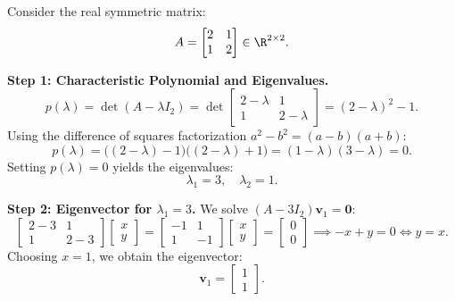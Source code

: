 \begin{example}
\label{ex:eigenvalues-2x2}
Consider the real symmetric matrix:
\begin{equation}
    A = \begin{bmatrix} 2 & 1 \\ 1 & 2 \end{bmatrix} \in \R^{2 \times 2}.
\end{equation}

\noindent\textbf{Step 1: Characteristic Polynomial and Eigenvalues.}
\begin{equation}
    p(\lambda) = \det(A - \lambda I_2) = \det \begin{bmatrix} 2-\lambda & 1 \\ 1 & 2-\lambda \end{bmatrix} = (2-\lambda)^2 - 1.
\end{equation}
Using the difference of squares factorization $a^2 - b^2 = (a-b)(a+b)$:
\begin{equation}
    p(\lambda) = \big((2-\lambda) - 1\big)\big((2-\lambda) + 1\big) = (1-\lambda)(3-\lambda) = 0.
\end{equation}
Setting $p(\lambda) = 0$ yields the eigenvalues:
\begin{equation}
    \lambda_1 = 3, \quad \lambda_2 = 1.
\end{equation}

\noindent\textbf{Step 2: Eigenvector for $\lambda_1 = 3$.}
We solve $(A - 3I_2)\mathbf{v}_1 = \mathbf{0}$:
\begin{equation}
    \begin{bmatrix} 2-3 & 1 \\ 1 & 2-3 \end{bmatrix} \begin{bmatrix} x \\ y \end{bmatrix} = \begin{bmatrix} -1 & 1 \\ 1 & -1 \end{bmatrix} \begin{bmatrix} x \\ y \end{bmatrix} = \begin{bmatrix} 0 \\ 0 \end{bmatrix} \implies -x + y = 0 \iff y = x.
\end{equation}
Choosing $x = 1$, we obtain the eigenvector:
\begin{equation}
    \mathbf{v}_1 = \begin{bmatrix} 1 \\ 1 \end{bmatrix}.
\end{equation}


\end{example}
